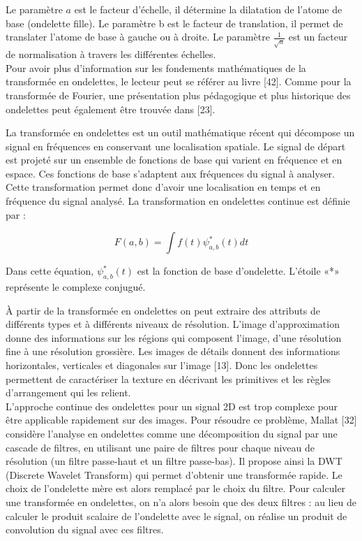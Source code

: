 Le paramètre $a$ est le facteur d’échelle, il détermine la dilatation de l'atome de base (ondelette fille). Le paramètre b est le facteur de translation, il permet de translater l'atome de base à gauche ou à droite. Le paramètre $ \frac{1}{\sqrt{a}} $ est un facteur de normalisation à travers les différentes échelles.\\

Pour avoir plus d'information sur les fondements mathématiques de la transformée en
ondelettes, le lecteur peut se référer au livre [42]. Comme pour la transformée de Fourier, une
présentation plus pédagogique et plus historique des ondelettes peut également être trouvée
dans [23].

La transformée en ondelettes est un outil mathématique récent qui décompose un signal en fréquences en conservant une localisation spatiale. Le signal de départ est projeté sur un ensemble de fonctions de base qui varient en fréquence et en espace. Ces fonctions de base s’adaptent aux fréquences du signal à analyser. Cette transformation permet donc d’avoir une localisation en temps et en fréquence du signal analysé. La transformation en ondelettes continue est définie par :

\begin{equation}
	 F(a,b) = {\int }f\left(t\right) \psi_{a,b}^*(t) dt  
\end{equation}

Dans cette équation, $ \psi_{a,b}^*(t) $ est la fonction de base d’ondelette. L’étoile «*» représente le complexe conjugué.

À partir de la transformée en ondelettes on peut extraire des attributs de différents types et à différents niveaux de résolution. L'image d'approximation donne des informations sur les régions qui composent l'image, d'une résolution fine à une résolution grossière. Les images de
détails donnent des informations horizontales, verticales et diagonales sur l'image [13]. Donc les ondelettes permettent de caractériser la texture en décrivant les primitives et les règles d'arrangement qui les relient.\\

L’approche continue des ondelettes pour un signal 2D est trop complexe pour être applicable
rapidement sur des images. Pour résoudre ce problème, Mallat [32] considère l'analyse en ondelettes comme une décomposition du signal par une cascade de filtres, en utilisant une
paire de filtres pour chaque niveau de résolution (un filtre passe-haut et un filtre passe-bas). Il propose ainsi la DWT (Discrete Wavelet Transform) qui permet d'obtenir une transformée rapide. Le choix de l'ondelette mère est alors remplacé par le choix du filtre. Pour calculer une transformée en ondelettes, on n'a alors besoin que des deux filtres : au lieu de calculer le produit scalaire de l'ondelette avec le signal, on réalise un produit de convolution du signal avec ces filtres.\\

